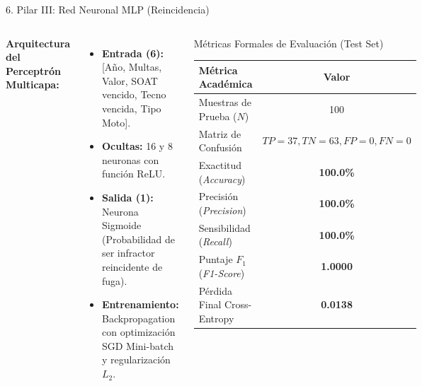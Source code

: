 \documentclass[aspectratio=169, 10pt]{beamer}
\begin{document}
\begin{frame}{6. Pilar III: Red Neuronal MLP (Reincidencia)}
    \begin{columns}
        \textbf{Arquitectura del Perceptrón Multicapa:}
        \begin{itemize}
            \item \textbf{Entrada (6):} [Año, Multas, Valor, SOAT vencido, Tecno vencida, Tipo Moto].
            \item \textbf{Ocultas:} 16 y 8 neuronas con función ReLU.
            \item \textbf{Salida (1):} Neurona Sigmoide (Probabilidad de ser infractor reincidente de fuga).
            \item \textbf{Entrenamiento:} Backpropagation con optimización SGD Mini-batch y regularización $L_2$.
        \end{itemize}

        \begin{block}{Métricas Formales de Evaluación (Test Set)}
            \begin{table}[h]
                \centering
                \footnotesize
                \begin{tabular}{lc}
                    \toprule
                    \textbf{Métrica Académica} & \textbf{Valor} \\
                    \midrule
                    Muestras de Prueba ($N$) & 100 \\
                    Matriz de Confusión & $TP=37, TN=63, FP=0, FN=0$ \\
                    Exactitud (\textit{Accuracy}) & \textbf{100.0\%} \\
                    Precisión (\textit{Precision}) & \textbf{100.0\%} \\
                    Sensibilidad (\textit{Recall}) & \textbf{100.0\%} \\
                    Puntaje $F_1$ (\textit{F1-Score}) & \textbf{1.0000} \\
                    Pérdida Final Cross-Entropy & \textbf{0.0138} \\
                    \bottomrule
                \end{tabular}
            \end{table}
        \end{block}
    \end{columns}
\end{frame}
\end{document}
